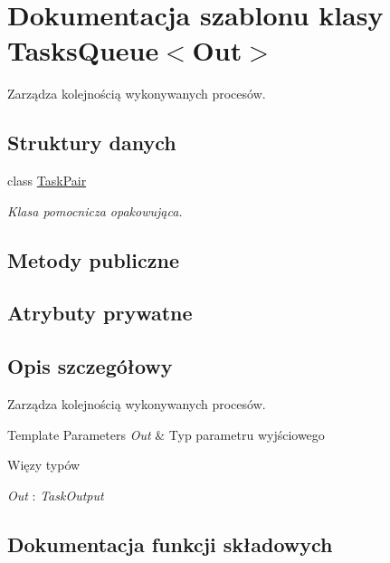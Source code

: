 \hypertarget{a00069}{}\section{Dokumentacja szablonu klasy Tasks\+Queue$<$Out$>$}
\label{a00069}


Zarządza kolejnością wykonywanych procesów.  


\subsection*{Struktury danych}
\begin{DoxyCompactItemize}
\item 
class \hyperlink{a00068}{Task\+Pair}
\begin{DoxyCompactList}\small\item\em Klasa pomocnicza opakowująca. \end{DoxyCompactList}\end{DoxyCompactItemize}
\subsection*{Metody publiczne}
\subsection*{Atrybuty prywatne}


\subsection{Opis szczegółowy}
Zarządza kolejnością wykonywanych procesów. 


\begin{DoxyTemplParams}{Template Parameters}
{\em Out} & Typ parametru wyjściowego\\
\hline
\end{DoxyTemplParams}
\begin{Desc}
\item[Więzy typów]\begin{description}
\item[{\em Out} : {\em Task\+Output}]\end{description}
\end{Desc}


\subsection{Dokumentacja funkcji składowych}
\hypertarget{a00069_a385e4c581e066545f168ff197493e073}{}
